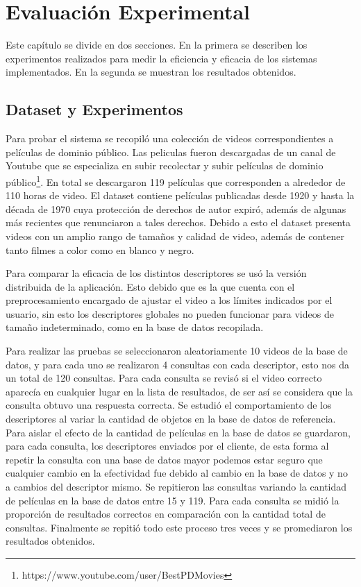 \chapter{Evaluación Experimental} \label{evaluacion}
Este capítulo se divide en dos secciones. En la primera se describen los experimentos realizados para medir la eficiencia y eficacia de los sistemas implementados. En la segunda se muestran los resultados obtenidos.

\section{Dataset y Experimentos}\label{experimentos}
Para probar el sistema se recopiló una colección de videos correspondientes a películas de dominio público. Las peliculas fueron descargadas de un canal de Youtube que se especializa en subir recolectar y subir películas de dominio público\footnote{https://www.youtube.com/user/BestPDMovies}. En total se descargaron 119 películas que corresponden a alrededor de 110 horas de video. El dataset contiene películas publicadas desde 1920 y hasta la década de 1970 cuya protección de derechos de autor expiró, además de algunas más recientes que renunciaron a tales derechos. Debido a esto el dataset presenta videos con un amplio rango de tamaños y calidad de video, además de contener tanto filmes a color como en blanco y negro. 

Para comparar la eficacia de los distintos descriptores se usó la versión distribuida de la aplicación. Esto debido que es la que cuenta con el preprocesamiento encargado de ajustar el video a los límites indicados por el usuario, sin esto los descriptores globales no pueden funcionar para videos de tamaño indeterminado, como en la base de datos recopilada.

Para realizar las pruebas se seleccionaron aleatoriamente 10 videos de la base de datos, y para cada uno se realizaron 4 consultas con cada descriptor, esto nos da un total de 120 consultas. Para cada consulta se revisó si el video correcto aparecía en cualquier lugar en la lista de resultados, de ser así se considera que la consulta obtuvo una respuesta correcta. Se estudió el comportamiento de los descriptores al variar la cantidad de objetos en la base de datos de referencia. Para aislar el efecto de la cantidad de películas en la base de datos se guardaron, para cada consulta, los descriptores enviados por el cliente, de esta forma al repetir la consulta con una base de datos mayor podemos estar seguro que cualquier cambio en la efectividad fue debido al cambio en la base de datos y no a cambios del descriptor mismo. Se repitieron las consultas variando la cantidad de películas en la base de datos entre 15 y 119. Para cada consulta se midió la proporción de resultados correctos en comparación con la cantidad total de consultas. Finalmente se repitió todo este proceso tres veces y se promediaron los resultados obtenidos.


